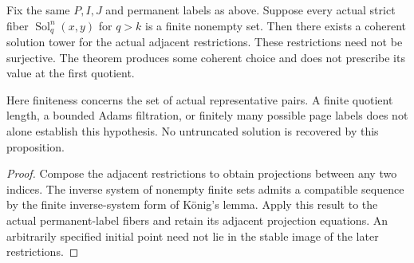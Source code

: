 \begin{proposition}
  \label{prop:synthetic-ess-coherent-tower-of-finite}
  \leanok
  Fix the same $P,I,J$ and permanent labels as above.  Suppose every actual
  strict fiber $\operatorname{Sol}_q^n(x,y)$ for $q>k$ is a finite nonempty
  set.  Then there exists a coherent solution tower for the actual adjacent
  restrictions.  These restrictions need not be surjective.  The theorem
  produces some coherent choice and does not prescribe its value at the
  first quotient.

  Here finiteness concerns the set of actual representative pairs.
  A finite quotient length, a bounded Adams filtration, or finitely many
  possible page labels does not alone establish this hypothesis.  No
  untruncated solution is recovered by this proposition.
\end{proposition}
\begin{proof}
  \leanok
  Compose the adjacent restrictions to obtain projections between any two
  indices.  The inverse system of nonempty finite sets admits a compatible
  sequence by the finite inverse-system form of K\"onig's lemma.  Apply
  this result to the actual permanent-label fibers and retain its adjacent
  projection equations.  An arbitrarily specified initial point need not
  lie in the stable image of the later restrictions.
\end{proof}

